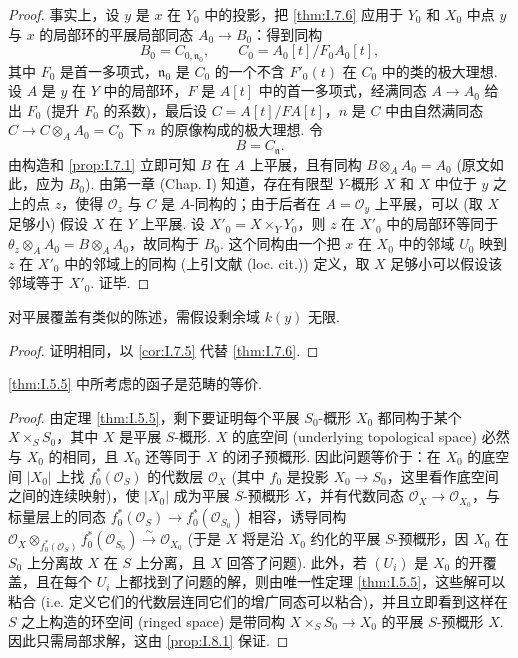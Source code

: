 \begin{proof}
事实上，设 $y$ 是 $x$ 在 $Y_0$ 中的投影，把 \ref{thm:I.7.6} 应用于 $Y_0$ 和 $X_0$ 中点 $y$ 与 $x$ 的局部环的平展局部同态 $A_0 \to B_0$：得到同构
\[
B_0 = C_{0,\mathfrak{n}_0}, \qquad C_0 = A_0[t]/F_0 A_0[t],
\]
其中 $F_0$ 是首一多项式，$\mathfrak{n}_0$ 是 $C_0$ 的一个不含 $F'_0(t)$ 在 $C_0$ 中的类的极大理想. 设 $A$ 是 $y$ 在 $Y$ 中的局部环，$F$ 是 $A[t]$ 中的首一多项式，经满同态 $A \to A_0$ 给出 $F_0$ (提升 $F_0$ 的系数)，最后设 $C = A[t]/FA[t]$，$n$ 是 $C$ 中由自然满同态 $C \to C \otimes_A A_0 = C_0$ 下 $n$ 的原像构成的极大理想. 令
\[
B = C_{\mathfrak{n}}.
\]
由构造和 \ref{prop:I.7.1} 立即可知 $B$ 在 $A$ 上平展，且有同构 $B \otimes_A A_0 = A_0$ (原文如此，应为 $B_0$). 由第一章 (Chap. I) 知道，存在有限型 $Y$-概形 $X$ 和 $X$ 中位于 $y$ 之上的点 $z$，使得 $\mathcal{O}_z$ 与 $C$ 是 $A$-同构的；由于后者在 $A = \mathcal{O}_y$ 上平展，可以 (取 $X$ 足够小) 假设 $X$ 在 $Y$ 上平展. 设 $X'_0 = X \times_Y Y_0$，则 $z$ 在 $X'_0$ 中的局部环等同于 $\theta_z \otimes_A A_0 = B \otimes_A A_0$，故同构于 $B_0$. 这个同构由一个把 $x$ 在 $X_0$ 中的邻域 $U_0$ 映到 $z$ 在 $X'_0$ 中的邻域上的同构 (上引文献 (loc. cit.)) 定义，取 $X$ 足够小可以假设该邻域等于 $X'_0$. 证毕.
\end{proof}

\begin{corollary}\label{cor:I.8.2}
对平展覆盖有类似的陈述，需假设剩余域 $k(y)$ 无限.
\end{corollary}

\begin{proof}
证明相同，以 \ref{cor:I.7.5} 代替 \ref{thm:I.7.6}.
\end{proof}

\begin{theorem}\label{thm:I.8.3}
\ref{thm:I.5.5} 中所考虑的函子是范畴的等价.
\end{theorem}

\begin{proof}
由定理 \ref{thm:I.5.5}，剩下要证明每个平展 $S_0$-概形 $X_0$ 都同构于某个 $X \times_S S_0$，其中 $X$ 是平展 $S$-概形. $X$ 的底空间 (underlying topological space) 必然与 $X_0$ 的相同，且 $X_0$ 还等同于 $X$ 的闭子预概形. 因此问题等价于：在 $X_0$ 的底空间 $|X_0|$ 上找 $f_0^{*}(\mathcal{O}_S)$ 的代数层 $\mathcal{O}_X$ (其中 $f_0$ 是投影 $X_0 \to S_0$，这里看作底空间之间的连续映射)，使 $|X_0|$ 成为平展 $S$-预概形 $X$，并有代数同态 $\mathcal{O}_X \to \mathcal{O}_{X_0}$，与标量层上的同态 $f_0^{*}(\mathcal{O}_S) \to f_0^{*}(\mathcal{O}_{S_0})$ 相容，诱导同构 $\mathcal{O}_X \otimes_{f_0^{*}(\mathcal{O}_S)} f_0^{*}(\mathcal{O}_{S_0}) \stackrel{\sim}{\longrightarrow} \mathcal{O}_{X_0}$ (于是 $X$ 将是沿 $X_0$ 约化的平展 $S$-预概形，因 $X_0$ 在 $S_0$ 上分离故 $X$ 在 $S$ 上分离，且 $X$ 回答了问题). 此外，若 $(U_i)$ 是 $X_0$ 的开覆盖，且在每个 $U_i$ 上都找到了问题的解，则由唯一性定理 \ref{thm:I.5.5}，这些解可以粘合 (i.e. 定义它们的代数层连同它们的增广同态可以粘合)，并且立即看到这样在 $S$ 之上构造的环空间 (ringed space) 是带同构 $X \times_S S_0 \to X_0$ 的平展 $S$-预概形 $X$. 因此只需局部求解，这由 \ref{prop:I.8.1} 保证.
\end{proof}

